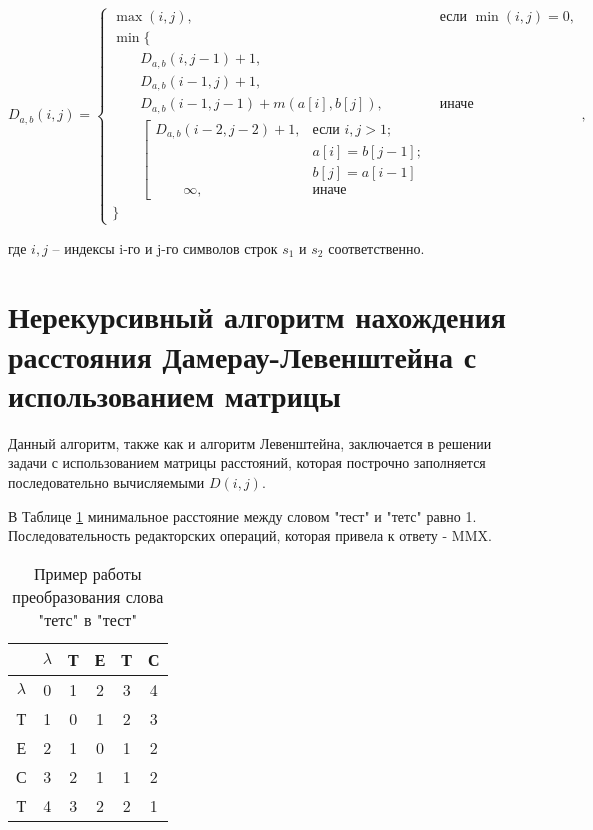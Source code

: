     \begin{equation}\label{formula:DamerauLevenshtein}
	D_{a,b}(i, j) = \begin{cases}
		\max(i, j), &\text{если }\min(i, j) = 0,\\
		\min \lbrace \\
		\qquad D_{a,b}(i, j-1) + 1,\\
		\qquad D_{a,b}(i-1, j) + 1,\\
		\qquad D_{a,b}(i-1, j-1) + m(a[i], b[j]), &\text{иначе}\\
		\qquad \left[ \begin{array}{cc}D_{a,b}(i-2, j-2) + 1, &\text{если }i,j > 1;\\
			\qquad &\text{}a[i] = b[j-1]; \\
			\qquad &\text{}b[j] = a[i-1]\\
			\qquad \infty, & \text{иначе}\end{array}\right.\\
		\rbrace
	\end{cases},
\end{equation} \par где \begin{math}i,j\end{math} -- индексы i-го и j-го символов строк $s_{1}$ и $s_{2}$ соответственно.

	\section{Нерекурсивный алгоритм нахождения расстояния Дамерау-Левенштейна с использованием матрицы}
	
	
	Данный алгоритм, также как и алгоритм Левенштейна, заключается в решении задачи с использованием матрицы расстояний, которая построчно заполняется последовательно вычисляемыми $D(i, j)$. 
	
	
		В Таблице \ref{table:example:DamLevenshtein} минимальное расстояние между
	словом "тест" и "тетс" равно 1. Последовательность редакторских операций,
	которая привела к ответу - MMX.
	
	\begin{table}[h]
		\caption{Пример работы преобразования слова "тетс" в "тест"}
		\centering
		\begin{tabular}{|c|c|c|c|c|c|}
			\hline
			& $\lambda$ & Т & Е & Т & С \\ \hline
			$\lambda$ & 0 & 1 & 2 & 3 & 4 \\ \hline
			Т & 1 & 0 & 1 & 2 & 3 \\ \hline
			Е & 2 & 1 & \cellcolor[HTML]{AFEEEE}0 & 1 & 2 \\ \hline
			С & 3 & 2 & 1 & \cellcolor[HTML]{AFEEEE}1 & \cellcolor[HTML]{AFEEEE}2 \\ \hline
			Т & 4 & 3 & 2 & \cellcolor[HTML]{AFEEEE}2 & \cellcolor[HTML]{FFCCC9}1\\ \hline
		\end{tabular}
		\label{table:example:DamLevenshtein}
	\end{table}
	
